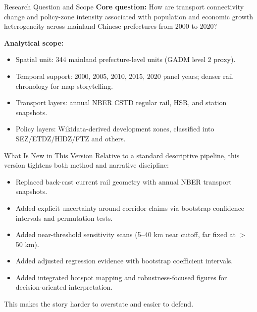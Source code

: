 \documentclass[aspectratio=169]{beamer}
\begin{document}
\begin{frame}{Research Question and Scope}
\small
\textbf{Core question:} How are transport connectivity change and policy-zone intensity associated with population and economic growth heterogeneity across mainland Chinese prefectures from 2000 to 2020?
\vspace{0.4em}

\textbf{Analytical scope:}
\begin{itemize}
  \item Spatial unit: 344 mainland prefecture-level units (GADM level 2 proxy).
  \item Temporal support: 2000, 2005, 2010, 2015, 2020 panel years; denser rail chronology for map storytelling.
  \item Transport layers: annual NBER CSTD regular rail, HSR, and station snapshots.
  \item Policy layers: Wikidata-derived development zones, classified into SEZ/ETDZ/HIDZ/FTZ and others.
\end{itemize}
\end{frame}

\begin{frame}{What Is New in This Version}
\small
Relative to a standard descriptive pipeline, this version tightens both method and narrative discipline:
\begin{itemize}
  \item Replaced back-cast current rail geometry with annual NBER transport snapshots.
  \item Added explicit uncertainty around corridor claims via bootstrap confidence intervals and permutation tests.
  \item Added near-threshold sensitivity scans (5--40 km near cutoff, far fixed at $>$50 km).
  \item Added adjusted regression evidence with bootstrap coefficient intervals.
  \item Added integrated hotspot mapping and robustness-focused figures for decision-oriented interpretation.
\end{itemize}
This makes the story harder to overstate and easier to defend.
\end{frame}
\end{document}
